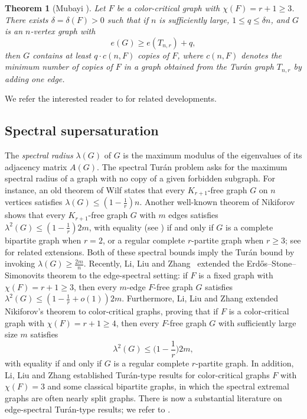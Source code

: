\documentclass[11pt,a4paper]{article}
\newtheorem{theorem}{Theorem}[section]
\theoremstyle{definition}
\theoremstyle{plain}
\renewcommand{\le}{\leqslant}
\renewcommand{\ge}{\geqslant}
\begin{document}
\begin{theorem}[Mubayi \cite{Mub2010}] 
\label{thm-Mub2010}
Let  $F$ be a color-critical graph
with $\chi (F)=r+1 \ge 3$. There exists $\delta =\delta (F)>0$ such that
if $n$ is sufficiently large, $1\le q \le \delta n$, and
$G$ is an $n$-vertex graph with
$$ e(G)\ge e(T_{n,r}) +q, $$  
then $G$ contains at least $q\cdot c(n,F) $ copies of $F$, where 
$c(n,F)$ denotes the minimum number of copies of $F$  in a  graph obtained from the Tur\'{a}n graph $T_{n,r}$ by adding one edge. 
\end{theorem}

We refer the interested reader to \cite{PY2017, KMP2020, MY2025, 
Rei2016, MWZ2026} for related developments. 


\subsection{Spectral supersaturation}

The \textit{spectral radius} $\lambda(G)$ of $G$ is the maximum modulus of the eigenvalues of its adjacency matrix $A(G)$.  
The spectral Tur\'an problem 
asks for the maximum spectral radius of a graph with no copy of a given forbidden subgraph. 
For instance, an old theorem of Wilf \cite{Wil1986} states that  every $K_{r+1}$-free graph $G$ on $n$ vertices satisfies $\lambda(G) \le \left(1-\frac{1}{r} \right)n$. 
Another well-known theorem of Nikiforov \cite{Nikiforov} shows that every $K_{r+1}$-free graph $G$ with $m$ edges satisfies $\lambda^2(G) \le \left(1-\frac{1}{r} \right)2m$, with equality (see  \cite{Nik2006, Nik2009}) if and only if $G$ is a complete bipartite graph when $r=2$, or a regular complete $r$-partite graph when $r\ge 3$; see \cite{KN2014,CY2026} for related extensions.  
Both of these spectral bounds imply the Tur\'{a}n bound by invoking $\lambda (G)\ge \frac{2m}{n}$.  
Recently, Li, Liu and Zhang~\cite{LLZ-edge-spectral}
extended the Erd\H{o}s--Stone--Simonovits  theorem to the edge-spectral setting:
if  $F$ is a fixed graph with $\chi(F)=r+1\ge 3$, then every $m$-edge
$F$-free graph $G$ satisfies $\lambda^2(G)\le \left(1-\frac1r+o(1)\right)2m$. 
Furthermore, Li, Liu and Zhang \cite{LLZ-edge-color-critical} extended Nikiforov's theorem to color-critical graphs, 
proving that if $F$ is a color-critical graph with $\chi (F)=r+1\ge 4$, then every $F$-free graph $G$ with sufficiently large size $m$ satisfies \begin{equation} \label{eq-LLZ}
\lambda^2(G)\le \Big( 1-\frac{1}{r} \Big)2m,
\end{equation}
with equality if and only if $G$ is a regular complete $r$-partite graph. In addition, 
Li, Liu and Zhang \cite{LLZ-edge-color-critical} established Tur\'{a}n-type results for color-critical graphs $F$ with $\chi (F)=3$ and some classical bipartite graphs, in which the spectral extremal graphs are often nearly split graphs. There is now a substantial literature on edge-spectral Tur\'{a}n-type results; we refer to \cite{ZLS2021,LZS2024,LLZ2025,LZZ2024,LLLY2026,ZLL2026}. 
\end{document}
